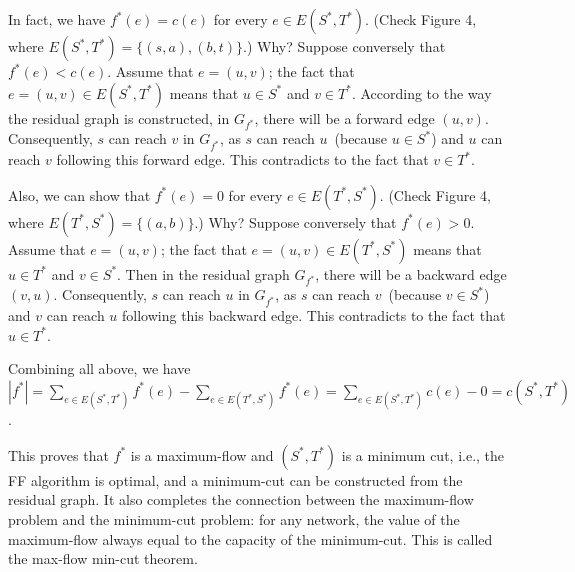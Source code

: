 In fact, we have $f^*(e) = c(e)$ for every $e \in E(S^*,T^*)$. (Check Figure 4, where
$E(S^*,T^*) = \{(s,a),(b,t)\}$.) Why? Suppose conversely that $f^*(e) < c(e)$.
Assume that $e = (u,v)$; the fact that $e = (u,v) \in E(S^*,T^*)$
means that $u \in S^*$ and $v \in T^*$. According to the way the residual graph is constructed, in $G_{f^*}$, there will be
a forward edge $(u,v)$. Consequently, $s$ can reach $v$ in $G_{f^*}$, as $s$ can reach $u$~(because $u\in S^*$) and $u$ can reach 
$v$ following this forward edge. This contradicts to the fact that $v \in T^*$.

Also, we can show that $f^*(e) = 0$ for every $e \in E(T^*,S^*)$. (Check Figure 4, where $E(T^*,S^*) = \{(a,b)\}$.)
Why? Suppose conversely that $f^*(e)>0$. Assume that $e=(u,v)$; the fact that $e=(u,v) \in E(T^*,S^*)$ means
that $u \in T^*$ and $v\in S^*$. Then in the residual graph $G_{f^*}$, there will be a backward edge 
$(v, u)$. Consequently, $s$ can reach $u$ in $G_{f^*}$, as $s$ can reach $v$~(because $v\in S^*$) and $v$ can reach $u$ following this backward edge. 
This contradicts to the fact that $u \in T^*$.

Combining all above, we have 
$|f^*| = \sum_{e\in E(S^*, T^*)} f^*(e) - \sum_{e\in E(T^*, S^*)} f^*(e)
 = \sum_{e\in E(S^*, T^*)} c(e) - 0 = c(S^*, T^*)$.

This proves that $f^*$ is a maximum-flow and $(S^*,T^*)$ is a minimum cut, i.e., the
FF algorithm is optimal, and a minimum-cut can be constructed from the residual
graph. It also completes the connection between the maximum-flow problem and
the minimum-cut problem: for any network, the value of the maximum-flow
always equal to the capacity of the minimum-cut. This is called the max-flow
min-cut theorem.


